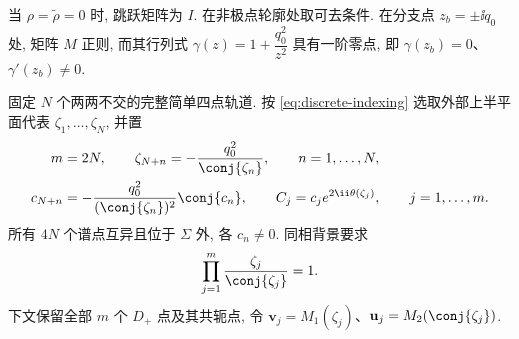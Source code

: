 当 $\rho=\widetilde\rho=0$ 时, 跳跃矩阵为 $I$. 在非极点轮廓处取可去条件. 在分支点 $z_b=\pm\ii q_0$ 处, 矩阵 $M$ 正则, 而其行列式 $\gamma(z)=1+\dfrac{q_0^2}{z^2}$ 具有一阶零点, 即 $\gamma(z_b)=0$、$\gamma'(z_b)\ne0$.

固定 $N$ 个两两不交的完整简单四点轨道. 按 \eqref{eq:discrete-indexing} 选取外部上半平面代表 $\zeta_1,\ldots,\zeta_N$, 并置
\begin{equation}\label{eq:N-orbit-data}
\begin{aligned}
m&=2N,\qquad \zeta_{N+n}=-\dfrac{q_0^2}{\conj{\zeta_n}},\qquad n=1,\ldots,N,\\
c_{N+n}&=-\dfrac{q_0^2}{(\conj{\zeta_n})^2}\conj{c_n},\qquad
C_j=c_je^{2\ii\theta(\zeta_j)},\qquad j=1,\ldots,m.
\end{aligned}
\end{equation}
所有 $4N$ 个谱点互异且位于 $\Sigma$ 外, 各 $c_n\ne0$. 同相背景要求
\begin{equation}\label{eq:N-orbit-phase}
\prod\limits_{j=1}^{m}\dfrac{\zeta_j}{\conj{\zeta_j}}=1.
\end{equation}
下文保留全部 $m$ 个 $D_+$ 点及其共轭点, 令 $\mathbf v_j=M_1(\zeta_j)$、$\mathbf u_j=M_2(\conj{\zeta_j})$.

